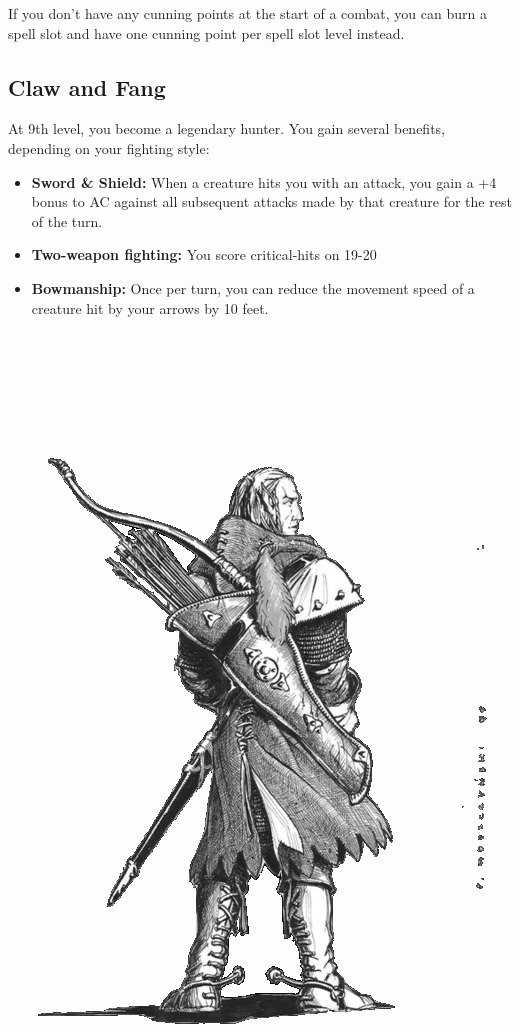 \begin{multicols*}{2}
If you don't have any cunning points at the start of a combat, you can burn a spell slot and have one cunning point per spell slot level instead.

\subsection*{Claw and Fang}

At 9th level, you become a legendary hunter. You gain several benefits, depending on your fighting style:

\begin{itemize}
    \item \textbf{Sword \& Shield:} When a creature hits you with an attack, you gain a +4 bonus to AC against all subsequent attacks made by that creature for the rest of the turn.
    \item \textbf{Two-weapon fighting:} You score critical-hits on 19-20
    \item \textbf{Bowmanship:} Once per turn, you can reduce the movement speed of a creature hit by your arrows by 10 feet.
\end{itemize}

\begin{Figure}
\centering
\includegraphics[width=\textwidth]{img/longbow.png}
\end{Figure}
    
\end{multicols*}


